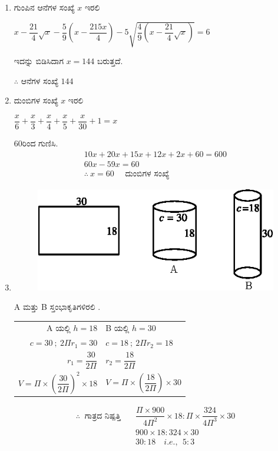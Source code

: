 \begin{enumerate}
\item ಗುಂಪಿನ ಆನೆಗಳ ಸಂಖ್ಯೆ $x$ ಇರಲಿ 

$x - \dfrac{21}{4} \sqrt{x} - \dfrac{5}{9} \left(x - \dfrac{215x}{4}\right) - 5 \sqrt{\dfrac{4}{9} \left(x - \dfrac{21}{4} \sqrt{x}\right)} = 6$

ಇದನ್ನು ಬಿಡಿಸಿದಾಗ $x = 144$ ಬರುತ್ತದೆ. 

$\therefore$ ಆನೆಗಳ ಸಂಖ್ಯೆ $144$

\item ದುಂಬಿಗಳ ಸಂಖ್ಯೆ $x$ ಇರಲಿ 

$\dfrac{x}{6} + \dfrac{x}{3} + \dfrac{x}{4} + \dfrac{x}{5} + \dfrac{x}{30} + 1 = x$

60ರಿಂದ ಗುಣಿಸಿ. 
\begin{gather*}
10x + 20x + 15x + 12x + 2x + 60 = 600\\
60x - 59x = 60\\
\therefore~ x = 60 \quad\text{ ದುಂಬಿಗಳ ಸಂಖ್ಯೆ}
\end{gather*}

\item 
\begin{figure}[H]
\centering
\includegraphics{images/chap9/ans26.eps}
\end{figure}

A ಮತ್ತು B ಸ್ತಂಭಾಕೃತಿಗಳಿರಲಿ . 

\begin{tabular}[t]{rl}
A ಯಲ್ಲಿ \quad $h = 18$ & B ಯಲ್ಲಿ \quad $h = 30$\\
$c = 30 ~;~ 2\Pi r_{1} = 30$  & $c = 18 ~;~ 2\Pi r_{2} = 18$\\
$r_{1} = \dfrac{30}{2\Pi}$ & $r_{2} = \dfrac{18}{2\Pi}$\\
$V = \Pi\times \left(\dfrac{30}{2\Pi}\right)^{2} \times 18$ & $V = \Pi\times \left(\dfrac{18}{2\Pi}\right) \times 30$
\end{tabular}

\begin{equation*}
\begin{split}
\therefore~ \text{ ಗಾತ್ರದ ನಿಷ್ಪತ್ತಿ}\quad & \dfrac{\Pi\times 900}{4\Pi^{2}} \times 18 : \Pi \times \dfrac{324}{4\Pi^{3}} \times 30\\
& 900\times 18 : 324\times 30\\
& 30 : 18\quad i.e.,~~ 5:3
\end{split}
\end{equation*}


\end{enumerate}
